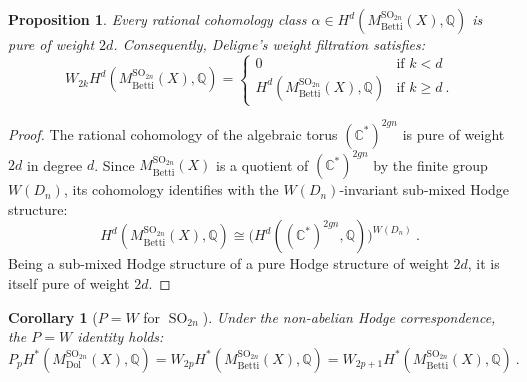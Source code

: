 \documentclass[11pt, a4paper]{amsart}
\newtheorem{proposition}[theorem]{Proposition}
\newtheorem{corollary}[theorem]{Corollary}
\theoremstyle{definition}
\theoremstyle{myitemstyle}
\DeclareMathOperator{\SO}{SO}
\newcommand{\Dol}{{\mathrm{Dol}}}
\newcommand{\Betti}{{\mathrm{Betti}}}
\begin{document}
\begin{proposition}\label{prop:Dn-Betti-weights}
Every rational cohomology class $\alpha \in H^d(M_{\Betti}^{\SO_{2n}}(X) , \mathbb{Q})$ is pure of weight $2d$. Consequently, Deligne's weight filtration satisfies:
\[
W_{2k} H^d(M_{\Betti}^{\SO_{2n}}(X) , \mathbb{Q}) = 
\begin{cases} 
0 & \text{if } k < d \\ 
H^d(M_{\Betti}^{\SO_{2n}}(X), \mathbb{Q}) & \text{if } k \ge d \ . 
\end{cases}
\]
\end{proposition}
\begin{proof}
The rational cohomology of the algebraic torus $(\mathbb{C}^*)^{2gn}$ is pure of weight $2d$ in degree $d$. Since $M_{\Betti}^{\SO_{2n}}(X) $ is a quotient of $(\mathbb{C}^*)^{2gn}$ by the finite group $W(D_n)$, its cohomology identifies with the $W(D_n)$-invariant sub-mixed Hodge structure:
\[
H^d(M_{\Betti}^{\SO_{2n}}(X) , \mathbb{Q}) \cong \big( H^d((\mathbb{C}^*)^{2gn}, \mathbb{Q}) \big)^{W(D_n)}\ .
\]
Being a sub-mixed Hodge structure of a pure Hodge structure of weight $2d$, it is itself pure of weight $2d$.
\end{proof}

\begin{corollary}[$P=W$ for $\SO_{2n}$]\label{cor:PW-Dn}
Under the non-abelian Hodge correspondence, the $P=W$ identity holds:
\[
P_p H^*(M_{\Dol}^{\SO_{2n}}(X) , \mathbb{Q}) = W_{2p} H^*(M_{\Betti}^{\SO_{2n}}(X) , \mathbb{Q}) = W_{2p+1} H^*(M_{\Betti}^{\SO_{2n}}(X) , \mathbb{Q})\ .
\]
\end{corollary}
\end{document}
